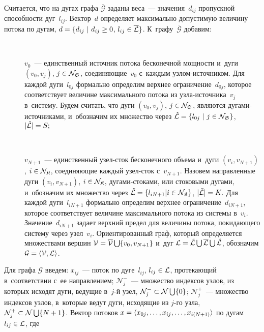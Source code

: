 \begin{multicols}{2}
Считается, что на дугах графа $\overline{\mathcal{G}}$ заданы веса~--- 
значения~$d_{ij}$ пропускной спо\-соб\-ности дуг~$l_{ij}$. 
Вектор~$d$ определяет максимально до\-пус\-ти\-мую величину потока  по дугам,
$d \hm= \{d_{ij} \ |\  d_{ij}\hm \geq 0$, $l_{ij}\hm\in \overline{\mathcal{L}}\}$.
К~графу~$\overline{\mathcal{G}}$ добавим:
\begin{description}
\item[\,]
$v_0$~---  единственный источник потока бесконечной мощности  и~дуги 
$(v_0, v_j)$,   $j \hm\in \mathcal{N}_\SS$, соединяющие~$v_0$ с~каждым 
уз\-лом-источ\-ни\-ком. Для каждой дуги~$l_{0j}$ формально определим 
верхнее ограничение~$d_{0j}$, которое соответствует величине максимального 
потока из уз\-ла-источ\-ни\-ка~$v_j$ в~сис\-те\-му. Будем считать, что  
дуги $(v_0, v_j)$, $j \hm\in \mathcal{N}_\SS$, являются ду\-га\-ми-источ\-ни\-ка\-ми, 
и~обозначим их множество через
$ \hat{\mathcal{L}}\hm=\{l_{0 j} \ | \  j \hm\in \mathcal{N}_\SS \}$, 
$| \hat{\mathcal{L}}| \hm=  S; $
\item[\,]
$v_{N+1}$~---  единственный узел-сток бесконечного объема и~дуги 
$(v_i, v_{N+1})$,  $i \hm\in \mathcal{N}_\SK$, соединяющие каждый 
узел-сток с~$v_{N+1}$. Назовем направленные дуги $(v_i, v_{N+1})$, 
$i \in \mathcal{N}_{\frak K}$,  ду\-га\-ми-сто\-ка\-ми, или стоковыми дугами, и~обозначим 
их множество через
$\tilde{\mathcal{L}}\hm=\{ l_{iN + 1}  |  i  \in \mathcal{N}_\SK\}$, 
$|\tilde{\mathcal{L}}| \hm=  K.$
Для каждой дуги~$l_{iN+1}$ формально определим верхнее ограничение~$d_{iN+1}$, 
которое соответствует величине максимального потока из системы в~$v_i$. 
Значение~$d_{iN+1}$ задает верхний предел для величины потока,  
покидающего систему через узел~$v_i$.
Ориентированный граф, который определяется множествами вершин $\mathcal{V}\hm = 
\overline{\mathcal{V}} \bigcup \{v_0, v_{N+1}\}$ и~дуг 
$\mathcal{L} \hm= \tilde{\mathcal{L}} \bigcup \overline{\mathcal{L}} 
\bigcup \hat{\mathcal{L}}$, обозначим $\mathcal{G} \hm= \langle {\mathcal{V}}, 
{\mathcal{L}} \rangle $.
\end{description}

Для графа $\mathcal{G}$ введем:
$x_{ij}$~--- поток по дуге~$l_{ij}$, $l_{ij}\hm\in {\mathcal{L}}$, 
протекающий в~соответствии с~ее направлением;
$\mathcal{N}^{-}_j$~--- множество индексов узлов, из которых исходят дуги, ведущие 
в~$j$-й узел, $\mathcal{N}^{-}_j \hm\subset \mathcal{N} \bigcup \{0\} $;
$\mathcal{N}^{+}_j$~--- множество индексов узлов, в~которые ведут дуги,
 исходящие из $j$-го узла, $\mathcal{N}^{+}_j \hm\subset \mathcal{N} \bigcup \{N+1\}$.
Вектор потоков
$x\hm= \langle x_{0j},\ldots, x_{ij},\ldots, x_{i(N+1)}\rangle$ по дугам 
$l_{ij}\hm\in {\mathcal{L}}$, где


\end{multicols}
